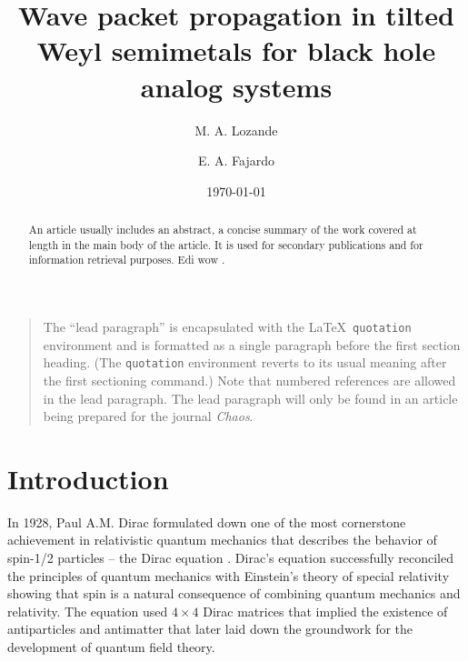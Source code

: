 \documentclass[%
 aip,
 amsmath,amssymb,
 reprint,%
]{revtex4-1}
\begin{document}

\title[Wave packet propagation in tilted Weyl semimetals for black hole analog systems]{Wave packet propagation in tilted Weyl semimetals for black hole analog systems}
\author{M. A. Lozande}
 
\author{E. A. Fajardo}%
%

\date{\today}%

\begin{abstract}
An article usually includes an abstract, a concise summary of the work
covered at length in the main body of the article. It is used for
secondary publications and for information retrieval purposes. Edi wow \cite{dirac1981}.
\end{abstract}

\maketitle

\begin{quotation}
The ``lead paragraph'' is encapsulated with the \LaTeX\ 
\verb+quotation+ environment and is formatted as a single paragraph before the first section heading. 
(The \verb+quotation+ environment reverts to its usual meaning after the first sectioning command.) 
Note that numbered references are allowed in the lead paragraph.
%
The lead paragraph will only be found in an article being prepared for the journal \textit{Chaos}.
\end{quotation}

\section{\label{sec:level1}Introduction}

In 1928, Paul A.M. Dirac formulated down one of the most cornerstone achievement in relativistic quantum mechanics that describes the behavior of spin-1/2 particles -- the Dirac equation \cite{dirac1928quantum,dirac1981}. Dirac's equation successfully reconciled the principles of quantum mechanics with Einstein's theory of special relativity \cite{einstein1905} showing that spin is a natural consequence of combining quantum mechanics and relativity. The equation used $4\times4$ Dirac matrices that implied the existence of antiparticles and antimatter that later laid down the groundwork for the development of quantum field theory.
\end{document}
